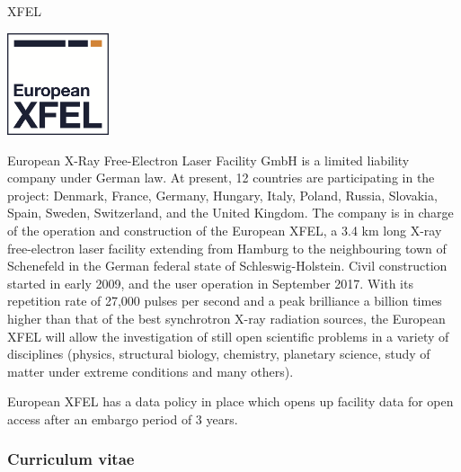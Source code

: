 \begin{sitedescription}{XFEL}
  \label{sitedescription:euxfel}



\begin{center}
\includegraphics[height=3cm]{Participants/Logos/XFEL.png}
\end{center}

  European X-Ray Free-Electron Laser Facility GmbH is a limited
  liability company under German law. At present, 12 countries are
  participating in the project: Denmark, France, Germany, Hungary,
  Italy, Poland, Russia, Slovakia, Spain, Sweden, Switzerland, and the
  United Kingdom.  The company is in charge of the operation and
  construction of the European XFEL, a 3.4 km long X-ray free-electron
  laser facility extending from Hamburg to the neighbouring town of
  Schenefeld in the German federal state of Schleswig-Holstein. Civil
  construction started in early 2009, and the user operation in
  September 2017. With its repetition rate of 27,000 pulses per second
  and a peak brilliance a billion times higher than that of the best
  synchrotron X-ray radiation sources, the European XFEL will allow
  the investigation of still open scientific problems in a variety of
  disciplines (physics, structural biology, chemistry, planetary
  science, study of matter under extreme conditions and many others).

  European XFEL has a data policy in place \cite{datapolicy-euxfel}
  which opens up facility data for open access after an embargo period
  of 3 years.
\subsubsection*{Curriculum vitae}

%




%



\end{sitedescription}
